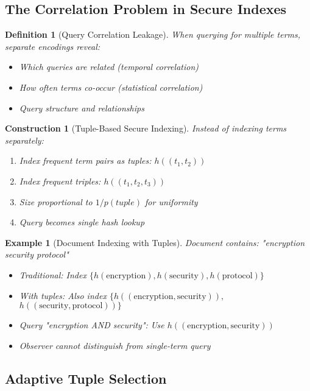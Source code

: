 \documentclass[11pt,final]{article}
\newtheorem{definition}[theorem]{Definition}
\newtheorem{example}[theorem]{Example}
\newtheorem{construction}[theorem]{Construction}
\begin{document}
\subsection{The Correlation Problem in Secure Indexes}

\begin{definition}[Query Correlation Leakage]
When querying for multiple terms, separate encodings reveal:
\begin{itemize}
    \item Which queries are related (temporal correlation)
    \item How often terms co-occur (statistical correlation)
    \item Query structure and relationships
\end{itemize}
\end{definition}

\begin{construction}[Tuple-Based Secure Indexing]
Instead of indexing terms separately:
\begin{enumerate}
    \item Index frequent term pairs as tuples: $h((t_1, t_2))$
    \item Index frequent triples: $h((t_1, t_2, t_3))$
    \item Size proportional to $1/p(tuple)$ for uniformity
    \item Query becomes single hash lookup
\end{enumerate}
\end{construction}

\begin{example}[Document Indexing with Tuples]
Document contains: "encryption security protocol"
\begin{itemize}
    \item Traditional: Index $\{h(\text{encryption}), h(\text{security}), h(\text{protocol})\}$
    \item With tuples: Also index $\{h((\text{encryption}, \text{security})),$ $h((\text{security}, \text{protocol}))\}$
    \item Query "encryption AND security": Use $h((\text{encryption}, \text{security}))$
    \item Observer cannot distinguish from single-term query
\end{itemize}
\end{example}

\subsection{Adaptive Tuple Selection}
\end{document}
